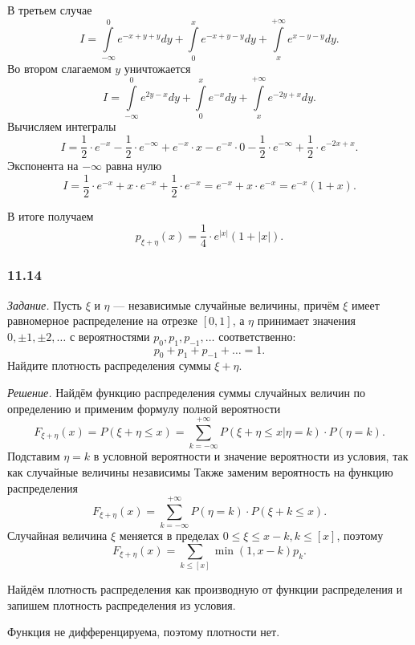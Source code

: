 В третьем случае
$$I =
\int \limits_{- \infty }^0 e^{-x+y+y} dy + \int \limits_0^x e^{-x+y-y} dy + \int \limits_x^{+ \infty } e^{x-y-y} dy.$$
Во втором слагаемом $y$ уничтожается
$$I =
\int \limits_{- \infty }^0 e^{2y-x} dy + \int \limits_0^x e^{-x} dy + \int \limits_x^{+ \infty } e^{-2y+x} dy.$$
Вычисляем интегралы
$$I =
\frac{1}{2} \cdot e^{-x} - \frac{1}{2} \cdot e^{- \infty } + e^{-x} \cdot x - e^{-x} \cdot 0 - \frac{1}{2} \cdot e^{- \infty } + \frac{1}{2} \cdot e^{-2x+x}.$$
Экспонента на $- \infty $ равна нулю
$$I =
\frac{1}{2} \cdot e^{-x} + x \cdot e^{-x} + \frac{1}{2} \cdot e^{-x} =
e^{-x} + x \cdot e^{-x} =
e^{-x} \left( 1+x \right).$$

В итоге получаем
$$p_{ \xi + \eta } \left( x \right) =
\frac{1}{4} \cdot e^{ \left| x \right| } \left( 1 + \left| x \right| \right).$$

\subsubsection*{11.14}

\textit{Задание.}
Пусть $ \xi $ и $ \eta $ --- независимые случайные величины,
причём $ \xi $ имеет равномерное распределение на отрезке $ \left[ 0, 1 \right] $,
а $ \eta $ принимает значения $0, \pm 1, \pm 2, \dotsc $ с вероятностями $p_0, p_1, p_{-1}, \dotsc $ соответственно:
$$p_0 + p_1 + p_{-1} + \dotsc =
1.$$
Найдите плотность распределения суммы $ \xi + \eta $.

\textit{Решение.} Найдём функцию распределения суммы случайных величин по определению и применим формулу полной вероятности
$$F_{ \xi + \eta } \left( x \right) =
P \left( \xi + \eta \leq x \right) =
\sum \limits_{k = - \infty }^{+ \infty } P \left( \left. \xi + \eta \leq x \right| \eta = k \right) \cdot P \left( \eta = k \right).$$
Подставим $ \eta = k$ в условной вероятности и значение вероятности из условия, так как случайные величины независимы
Также заменим вероятность на функцию распределения
$$F_{ \xi + \eta } \left( x \right) =
\sum \limits_{k = - \infty }^{+ \infty } P \left( \eta = k \right) \cdot P \left( \xi + k \leq x \right).$$
Случайная величина $ \xi $ меняется в пределах $0 \leq \xi \leq x - k, k \leq \left[ x \right] $, поэтому
$$F_{ \xi + \eta } \left( x \right) =
\sum \limits_{k \leq \left[ x \right] } \min \left( 1, x-k \right) p_k.$$

Найдём плотность распределения как производную от функции распределения и запишем плотность распределения из условия.

Функция не дифференцируема, поэтому плотности нет.

